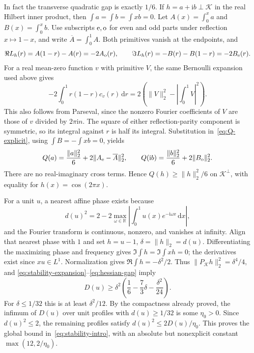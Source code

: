 \documentclass[11pt,reqno]{amsart}
\numberwithin{equation}{section}
\newcommand{\R}{\mathbb R}
\newcommand{\dd}{\,\mathrm d}
\newcommand{\ii}{\mathrm i}
\newcommand{\norm}[1]{\lVert#1\rVert}
\begin{document}
In fact the transverse quadratic gap is exactly $1/6$.
If $h=a+\ii b\perp\mathcal K$ in the real Hilbert inner
product, then $\int a=\int b=\int xb=0$.
Let $A(x)=\int_0^xa$ and $B(x)=\int_0^xb$.
Use subscripts ${\rm e},{\rm o}$ for even and odd parts under
reflection $x\mapsto1-x$, and write $\overline A=\int_0^1A$.
Both primitives vanish at the endpoints, and
\[
 \Re L_h(r)=A(1-r)-A(r)=-2A_{\rm o}(r),\qquad
 \Im L_h(r)=-B(r)-B(1-r)=-2B_{\rm e}(r).
\]
For a real mean-zero function $v$ with primitive $V$, the same
Bernoulli expansion used above gives
\[
 -2\int_0^1r(1-r)c_v(r)\dd r
       =2\left(\norm V_2^2-\left|\int_0^1V\right|^2\right).
\]
This also follows from Parseval, since the nonzero Fourier
coefficients of $V$ are those of $v$ divided by $2\pi\ii n$.
The square of either reflection-parity component is symmetric,
so its integral against $r$ is half its integral. Substitution
in~\eqref{eq:Q-explicit}, using $\int B=-\int xb=0$, yields
\begin{equation}\label{eq:hessian-gap}
 Q(a)=\frac{\norm a_2^2}{6}
                   +2\norm{A_{\rm e}-\overline A}_2^2,
 \qquad
 Q(\ii b)=\frac{\norm b_2^2}{6}+2\norm{B_{\rm o}}_2^2.
\end{equation}
There are no real-imaginary cross terms. Hence
$Q(h)\ge\norm h_2^2/6$ on $\mathcal K^\perp$, with equality
for $h(x)=\cos(2\pi x)$.

For a unit $u$, a nearest affine phase exists because
\[
 d(u)^2=2-2\max_{\omega\in\R}
                 \left|\int_0^1u(x)e^{-\ii\omega x}\dd x\right|,
\]
and the Fourier transform is continuous, nonzero, and vanishes
at infinity. Align that nearest phase with $1$ and set $h=u-1$,
$\delta=\norm h_2=d(u)$. Differentiating the maximizing phase
and frequency gives $\Im\int h=\Im\int xh=0$; the derivatives
exist since $xu\in L^1$. Normalization gives
$\Re\int h=-\delta^2/2$. Thus
$\norm{P_{\mathcal K}h}_2^2=\delta^4/4$, and
\eqref{eq:stability-expansion}--\eqref{eq:hessian-gap} imply
\begin{equation}\label{eq:local-stability}
 D(u)\ge\delta^2\left(\frac16-\frac73\delta
                                        -\frac{\delta^2}{24}\right).
\end{equation}
For $\delta\le1/32$ this is at least $\delta^2/12$.
By the compactness already proved, the infimum of $D(u)$ over
unit profiles with $d(u)\ge1/32$ is some $\eta_0>0$.
Since $d(u)^2\le2$, the remaining profiles satisfy
$d(u)^2\le2D(u)/\eta_0$. This proves the global bound
in~\eqref{eq:stability-intro}, with an absolute but nonexplicit
constant $\max(12,2/\eta_0)$.
\end{document}
